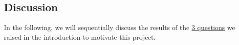 \documentclass{article}
\begin{document}
\begin{multicols}{2}





\section*{Discussion}
\label{sec:discuss}
In the following, we will sequentially discuss the results of the \hyperref[sec:Q]{3 questions} we raised in the introduction to motivate this project.
\\



\end{multicols}
\end{document}
